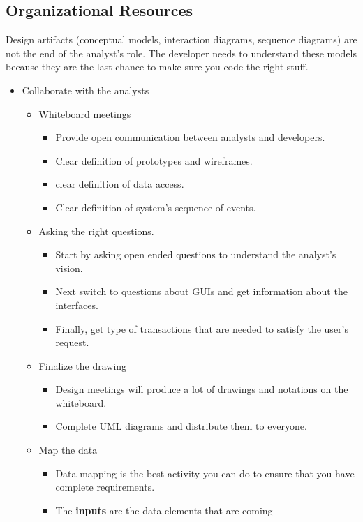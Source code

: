 \documentclass[12pt]{article}
\begin{document}
\subsection{Organizational Resources}
Design artifacts (conceptual models, interaction diagrams, sequence diagrams) are not the end of the
analyst's role. The developer needs to understand these models because they are the last chance to make
sure you code the right stuff.
\begin{itemize}
	\item Collaborate with the analysts
		\begin{itemize}
			\item Whiteboard meetings
				\begin{itemize}
					\item Provide open communication between analysts and developers.
					\item Clear definition of prototypes and wireframes.
					\item clear definition of data access.
					\item Clear definition of system's sequence of events.
				\end{itemize}
			\item Asking the right questions.
				\begin{itemize}
					\item Start by asking open ended questions to understand the
						analyst's vision.
					\item Next switch to questions about GUIs and get information
						about the interfaces.
					\item Finally, get type of transactions that are needed to
						satisfy the user's request.
				\end{itemize}
			\item Finalize the drawing
				\begin{itemize}
					\item Design meetings will produce a lot of drawings and notations
						on the whiteboard.
					\item Complete UML diagrams and distribute them to everyone.
				\end{itemize}
			\item Map the data
				\begin{itemize}
					\item Data mapping is the best activity you can do to ensure
						that you have complete requirements.
					\item The \textbf{inputs} are the data elements that are coming

\end{itemize}
\end{itemize}
\end{itemize}
\end{document}
